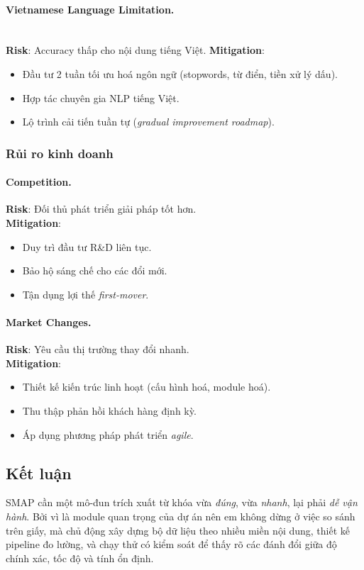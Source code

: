 \paragraph{Vietnamese Language Limitation.} \\

\textbf{Risk}: Accuracy thấp cho nội dung tiếng Việt.
\textbf{Mitigation}:
\begin{itemize}
  \item Đầu tư 2 tuần tối ưu hoá ngôn ngữ (stopwords, từ điển, tiền xử lý dấu).
  \item Hợp tác chuyên gia NLP tiếng Việt.
  \item Lộ trình cải tiến tuần tự (\textit{gradual improvement roadmap}).
\end{itemize}

\subsubsection{Rủi ro kinh doanh}

\paragraph{Competition.}
\textbf{Risk}: Đối thủ phát triển giải pháp tốt hơn.\\
\textbf{Mitigation}:
\begin{itemize}
  \item Duy trì đầu tư R\&D liên tục.
  \item Bảo hộ sáng chế cho các đổi mới.
  \item Tận dụng lợi thế \textit{first-mover}.
\end{itemize}

\paragraph{Market Changes.}
\textbf{Risk}: Yêu cầu thị trường thay đổi nhanh.\\
\textbf{Mitigation}:
\begin{itemize}
  \item Thiết kế kiến trúc linh hoạt (cấu hình hoá, module hoá).
  \item Thu thập phản hồi khách hàng định kỳ.
  \item Áp dụng phương pháp phát triển \textit{agile}.
\end{itemize}

\subsection{Kết luận}
SMAP cần một mô-đun trích xuất từ khóa vừa \emph{đúng}, vừa \emph{nhanh}, lại phải \emph{dễ vận hành}. Bởi vì là module quan trọng của dự án nên em không dừng ở việc so sánh trên giấy, mà chủ động xây dựng bộ dữ liệu theo nhiều miền nội dung, thiết kế pipeline đo lường, và chạy thử có kiểm soát để thấy rõ các đánh đổi giữa độ chính xác, tốc độ và tính ổn định.

